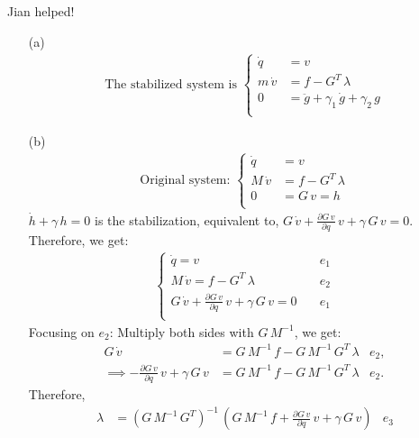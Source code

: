 Jian helped!
\begin{enumerate}
	\item[(a)] \begin{align*}
		 \text{The stabilized system is }\begin{cases}
		 	\dot q &= v \\
		 	m\,\dot v &= f - G^T\,\lambda \\
		 	0 &= \ddot g + \gamma_1\,\dot g + \gamma_2\,g \\		 	
		 \end{cases}
		\end{align*}
	\item[(b)] \begin{align*}
		\text{Original system: }\begin{cases}
			\dot q &= v \\
			M\,\dot v &= f - G^T\,\lambda \\
			0 &= G\,v = h\\		 	
		\end{cases}
	\end{align*}
	$\dot h + \gamma\,h = 0$ is the stabilization, equivalent to, $G\,\dot v + \frac{\partial G\,v}{\partial q}\,v + \gamma\,G\,v = 0$.
	Therefore, we get:
	\begin{align*}
		\begin{cases}
			\dot q = v \quad & e_1 \\
			M\,\dot v = f - G^T\,\lambda \quad & e_2\\
			G\,\dot v + \frac{\partial G\,v}{\partial q}\,v + \gamma\,G\,v = 0 \quad & e_1\\		 	
		\end{cases}
	\end{align*}
	Focusing on $e_2$:
	Multiply both sides with $G\,M^{-1}$, we get:
	\begin{align*}
		G\,\dot v &= G\,M^{-1}\,f - G\,M^{-1}\,G^T\,\lambda & e_2,\\
		\implies -\frac{\partial G\,v}{\partial q}\,v + \gamma\,G\,v &= G\,M^{-1}\,f - G\,M^{-1}\,G^T\,\lambda & e_2.
	\end{align*}
	Therefore,
	\begin{align*}
		\lambda&= \left(G\,M^{-1}\,G^T\right)^{-1}\,\left(G\,M^{-1}\,f + \frac{\partial G\,v}{\partial q}\,v + \gamma\,G\,v\right)& e_3

\end{align*}
\end{enumerate}
